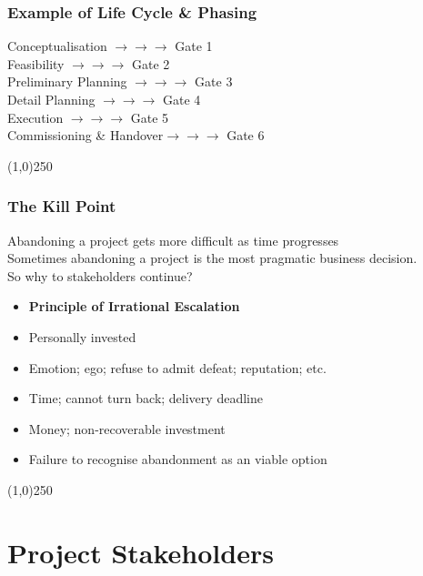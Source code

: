 \begin{frame}
\frametitle{Example of Life Cycle \& Phasing}
Conceptualisation \hfill$\longrightarrow\longrightarrow\longrightarrow$ Gate 1\\
Feasibility \hfill$\longrightarrow\longrightarrow\longrightarrow$ Gate 2\\
Preliminary Planning \hfill$\longrightarrow\longrightarrow\longrightarrow$ Gate 3\\
Detail Planning \hfill$\longrightarrow\longrightarrow\longrightarrow$ Gate 4\\
Execution \hfill$\longrightarrow\longrightarrow\longrightarrow$ Gate 5\\
Commissioning \& Handover\hfill$\longrightarrow\longrightarrow\longrightarrow$ Gate 6\\
\end{frame}
\begin{center}\line(1,0){250}\end{center}





\begin{frame}
\frametitle{The Kill Point}
Abandoning a project gets more difficult as time progresses\\
Sometimes abandoning a project is the most pragmatic business decision.\\
So why to stakeholders continue?\\
\begin{itemize}
\item \textbf{Principle of Irrational Escalation}
\item Personally invested
\item Emotion; ego; refuse to admit defeat; reputation; etc.
\item Time; cannot turn back; delivery deadline
\item Money; non-recoverable investment
\item Failure to recognise abandonment as an viable option
\end{itemize}
\end{frame}
\begin{center}\line(1,0){250}\end{center}



\section{Project Stakeholders}


